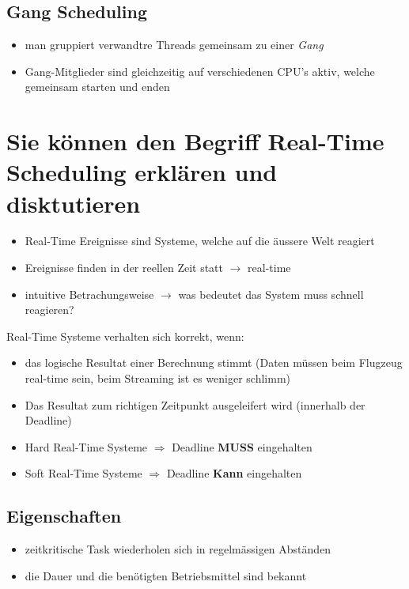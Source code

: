 \documentclass{report}
\theoremstyle{definition}
\theoremstyle{example}
\begin{document}
	\subsection{Gang Scheduling}
\begin{itemize}
	\item man gruppiert verwandtre Threads gemeinsam zu einer \textit{Gang}
	\item Gang-Mitglieder sind gleichzeitig auf verschiedenen CPU's aktiv, welche gemeinsam starten und enden
\end{itemize}	

\section{Sie können den Begriff Real-Time Scheduling erklären und disktutieren}
\begin{itemize}
	\item Real-Time Ereignisse sind Systeme, welche auf die äussere Welt reagiert
	\item Ereignisse finden in der reellen Zeit statt $\rightarrow$ real-time
	\item intuitive Betrachungsweise $\rightarrow$ was bedeutet das System muss schnell reagieren?
\end{itemize}

Real-Time Systeme verhalten sich korrekt, wenn:
\begin{itemize}
	\item das logische Resultat einer Berechnung stimmt (Daten müssen beim Flugzeug real-time sein, beim Streaming ist es weniger schlimm)
	\item Das Resultat zum richtigen Zeitpunkt ausgeleifert wird (innerhalb der Deadline)
	\item Hard Real-Time Systeme $\Rightarrow$ Deadline \textbf{MUSS} eingehalten
	\item Soft Real-Time Systeme $\Rightarrow$ Deadline \textbf{Kann} eingehalten
\end{itemize}

	\subsection{Eigenschaften}
\begin{itemize}
	\item zeitkritische Task wiederholen sich in regelmässigen Abständen
	\item die Dauer und die benötigten Betriebsmittel sind bekannt
\end{itemize}
\end{document}
